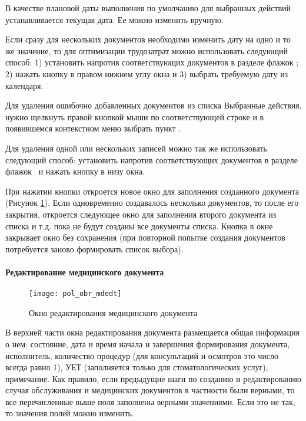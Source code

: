 В качестве плановой даты выполнения по умолчанию для выбранных действий устанавливается текущая дата. Ее можно изменить вручную.

\begin{prim}
 Если сразу для нескольких документов необходимо изменить дату на одно и то же значение, то для оптимизации трудозатрат можно использовать следующий способ: 1) установить напротив соответствующих документов в разделе  флажок \putx ; 2) нажать кнопку  в правом нижнем углу окна  и 3) выбрать требуемую дату из календаря.
\end{prim} 
 
Для удаления ошибочно добавленных документов из списка Выбранные действия, нужно щелкнуть правой кнопкой мыши по соответствующей строке и в появившемся контекстном меню выбрать пункт .

\begin{prim}
 Для удаления одной или нескольких записей можно так же использовать следующий способ: установить напротив соответствующих документов в разделе  флажок \putx~и нажать кнопку  в низу окна.
\end{prim} 
 
При нажатии кнопки   откроется новое окно для заполнения созданного документа (Рисунок \ref{img_pol_obr_mdedt}). Если одновременно создавалось несколько документов, то после его закрытия, откроется следующее окно для заполнения второго документа из списка и т.д. пока не будут созданы все документы списка. Кнопка  в окне  закрывает окно без сохранения (при повторной попытке создания документов потребуется заново формировать список выбора).

\paragraph{Редактирование медицинского документа} \label{pol_obr_mdedt}

\begin{figure}[ht]\centering
 \texttt{[image: pol\_obr\_mdedt]}
 \caption{Окно редактирования медицинского документа}
 \label{img_pol_obr_mdedt}
\end{figure}

В верхней части окна редактирования документа размещается общая информация о нем: состояние, дата и время начала и завершения формирования документа, исполнитель, количество процедур (для консультаций и осмотров это число всегда равно 1), УЕТ (заполняется только для стоматологических услуг), примечание. Как правило, если предыдущие шаги по созданию и редактированию случая обслуживания и медицинских документов в частности были верными, то все перечисленные выше поля заполнены верными значениями. Если это не так, то значения полей можно изменить.

